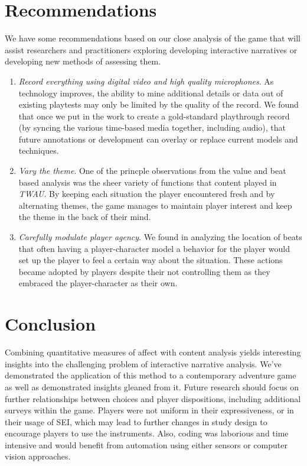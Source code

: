 \section{Recommendations}
\label{sec:org35e8d4a}
We have some recommendations based on our close analysis of the game
that will assist researchers and practitioners exploring developing
interactive narratives or developing new methods of assessing them.

\begin{enumerate}
\item \emph{Record everything using digital video and high quality
microphones}. As technology improves, the ability to mine
additional details or data out of existing playtests may only be
limited by the quality of the record. We found that once we put in
the work to create a gold-standard playthrough record (by syncing
the various time-based media together, including audio), that
future annotations or development can overlay or replace current
models and techniques.
\item \emph{Vary the theme}. One of the princple observations from the value
and beat based analysis was the sheer variety of functions that
content played in \emph{TWAU}. By keeping each situation the player
encountered fresh and by alternating themes, the game manages to
maintain player interest and keep the theme in the back of their
mind.
\item \emph{Carefully modulate player agency}. We found in analyzing the
location of beats that often having a player-character model a
behavior for the player would set up the player to feel a certain
way about the situation. These actions became adopted by players
despite their not controlling them as they embraced the
player-character as their own.
\end{enumerate}

\section{Conclusion}
\label{sec:org0c7891e}
Combining quantitative measures of affect with content analysis yields
interesting insights into the challenging problem of interactive
narrative analysis. We've demonstrated the application of this method
to a contemporary adventure game as well as demonstrated insights
gleaned from it. Future research should focus on further relationships
between choices and player dispositions, including additional surveys
within the game. Players were not uniform in their expressiveness, or
in their usage of SEI, which may lead to further changes in study
design to encourage players to use the instruments. Also, coding was
laborious and time intensive and would benefit from automation using
either sensors or computer vision approaches.

